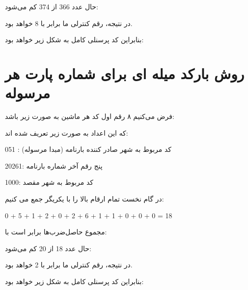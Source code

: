 \documentclass[12pt,a4paper]{report}
\begin{document}
حال عدد 366 از 374  کم  می‌شود:
\begin{center}
\end{center}

در نتیجه، رقم کنترلی ما برابر با 8 خواهد بود.

بنابراین کد پرسنلی کامل به شکل زیر خواهد بود:

\begin{center}
\end{center}
\newpage
\section{روش بارکد میله ای برای شماره پارت  هر مرسوله}
فرض می‌کنیم ۸ رقم اول کد هر ماشین  به صورت زیر باشد:

\begin{center}
\end{center}
که این اعداد به صورت زیر تعریف شده اند:

051 : کد مربوط به شهر صادر کننده بارنامه (مبدا مرسوله)

20261: پنج رقم آخر شماره بارنامه

1000: کد مربوط به شهر مقصد

در گام نخست تمام ارقام بالا را با یکریگر جمع می کنیم:
\begin{center}
	\begin{latin}
0 + 5 + 1 + 2 + 0 + 2 + 6 + 1 + 1 + 0 + 0 + 0 = 18
	\end{latin}
\end{center}
مجموع حاصل‌ضرب‌ها برابر است با:
\begin{center}
\end{center}


حال عدد 18 از 20  کم  می‌شود:
\begin{center}
\end{center}

در نتیجه، رقم کنترلی ما برابر با 2 خواهد بود.

بنابراین کد پرسنلی کامل به شکل زیر خواهد بود:

\begin{center}
\end{center}
\newpage
\end{document}
